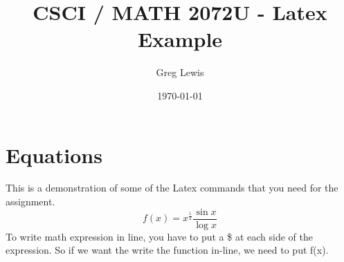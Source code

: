 \documentclass{article}
\title{CSCI / MATH 2072U - Latex Example}
\author{Greg Lewis}         %
\date{\today}           %
\begin{document}
\maketitle

\section{Equations}

This is a demonstration of some of the Latex commands that you need for the assignment.
\[
f(x)= x^{\frac{1}{2} } \frac{\sin x}{\log x} \]
To write math        expression in line, you have to put a \$ at each
side of the expression.  So if we want the write the function in-line, we need to put f(x).
\end{document}
